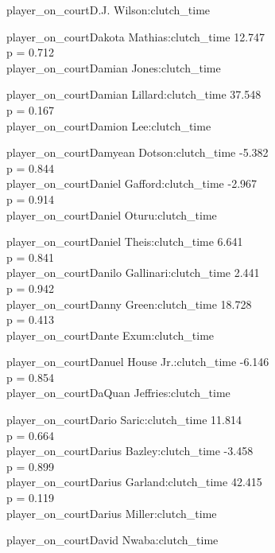 \documentclass[
  landscape]{article}
\begin{document}
player\_on\_courtD.J. Wilson:clutch\_time

player\_on\_courtDakota Mathias:clutch\_time 12.747\\
p = 0.712\\
player\_on\_courtDamian Jones:clutch\_time

player\_on\_courtDamian Lillard:clutch\_time 37.548\\
p = 0.167\\
player\_on\_courtDamion Lee:clutch\_time

player\_on\_courtDamyean Dotson:clutch\_time -5.382\\
p = 0.844\\
player\_on\_courtDaniel Gafford:clutch\_time -2.967\\
p = 0.914\\
player\_on\_courtDaniel Oturu:clutch\_time

player\_on\_courtDaniel Theis:clutch\_time 6.641\\
p = 0.841\\
player\_on\_courtDanilo Gallinari:clutch\_time 2.441\\
p = 0.942\\
player\_on\_courtDanny Green:clutch\_time 18.728\\
p = 0.413\\
player\_on\_courtDante Exum:clutch\_time

player\_on\_courtDanuel House Jr.:clutch\_time -6.146\\
p = 0.854\\
player\_on\_courtDaQuan Jeffries:clutch\_time

player\_on\_courtDario Saric:clutch\_time 11.814\\
p = 0.664\\
player\_on\_courtDarius Bazley:clutch\_time -3.458\\
p = 0.899\\
player\_on\_courtDarius Garland:clutch\_time 42.415\\
p = 0.119\\
player\_on\_courtDarius Miller:clutch\_time

player\_on\_courtDavid Nwaba:clutch\_time
\end{document}
